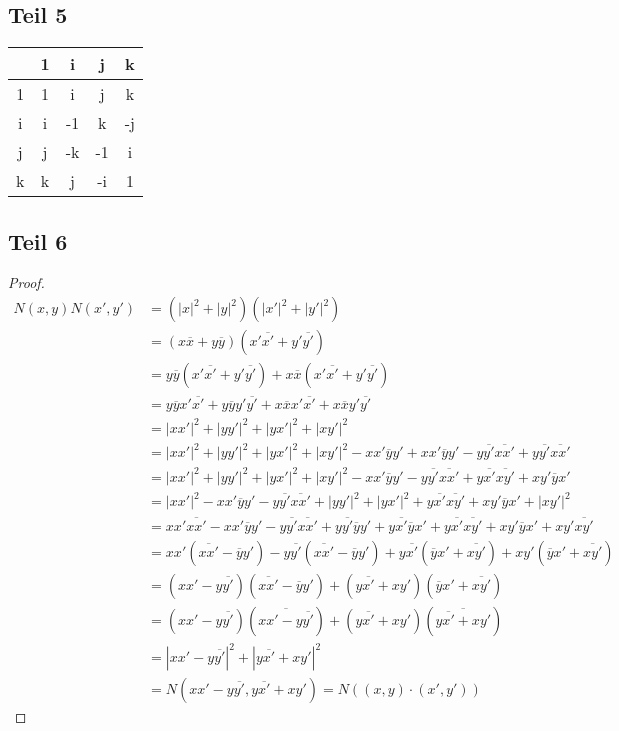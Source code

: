 \documentclass[10pt,a4paper]{article}
\begin{document}
\subsection*{Teil 5}

\begin{tabular}{c|c|c|c|c}
  & 1 & i & j & k\\
\hline
1 & 1 & i & j & k\\
\hline
i & i & -1 & k & -j\\
\hline
j & j & -k & -1 & i\\
\hline
k & k & j & -i & 1
\end{tabular}

\subsection*{Teil 6}

\begin{proof}
\begin{align*}
N(x, y)N(x', y') & = (|x|^{2} + |y|^{2})(|x'|^{2} + |y'|^{2})\\
& = (x\overline{x} + y\overline{y})(x'\overline{x'} + y'\overline{y'})\\
& = y\overline{y}(x'\overline{x'} + y'\overline{y'}) + x\overline{x}(x'\overline{x'} + y'\overline{y'})\\
& = y\overline{y}x'\overline{x'} + y\overline{y}y'\overline{y'} + x\overline{x}x'\overline{x'} + x\overline{x}y'\overline{y'}\\
& = |xx'|^{2} + |yy'|^{2} + |yx'|^{2} + |xy'|^{2}\\
& = |xx'|^{2} + |yy'|^{2} + |yx'|^{2} + |xy'|^{2} - xx'\overline{y}y' + xx'\overline{y}y' - y\overline{y'}\overline{xx'} + y\overline{y'}\overline{xx'}\\
& = |xx'|^{2} + |yy'|^{2} + |yx'|^{2} + |xy'|^{2} - xx'\overline{y}y' - y\overline{y'}\overline{xx'} + y\overline{x'}\overline{xy'} + xy'\overline{y}x'\\
& = |xx'|^{2} - xx'\overline{y}y' - y\overline{y'}\overline{xx'} + |yy'|^{2} + |yx'|^{2} + y\overline{x'}\overline{xy'} + xy'\overline{y}x' + |xy'|^{2}\\
& = xx'\overline{xx'} - xx'\overline{y}y' - y\overline{y'}\overline{xx'} + y\overline{y'}\overline{y}y' + y\overline{x'}\overline{y}x' + y\overline{x'}\overline{xy'} + xy'\overline{y}x' + xy'\overline{xy'}\\
& = xx'(\overline{xx'} - \overline{y}y') - y\overline{y'}(\overline{xx'} - \overline{y}y') + y\overline{x'}(\overline{y}x' + \overline{xy'}) + xy'(\overline{y}x' + \overline{xy'})\\
& = (xx' - y\overline{y'})(\overline{xx'} - \overline{y}y') + (y\overline{x'} + xy')(\overline{y}x' + \overline{xy'})\\
& = (xx' - y\overline{y'})(\overline{xx' - y\overline{y'}}) + (y\overline{x'} + xy')(\overline{y\overline{x'} + xy'})\\
& = |xx' - y\overline{y'}|^{2} + |y\overline{x'} + xy'|^{2}\\
& = N(xx' - y\overline{y'}, y\overline{x'} + xy') = N((x, y) \cdot (x', y'))
\end{align*}
\end{proof}
\end{document}
